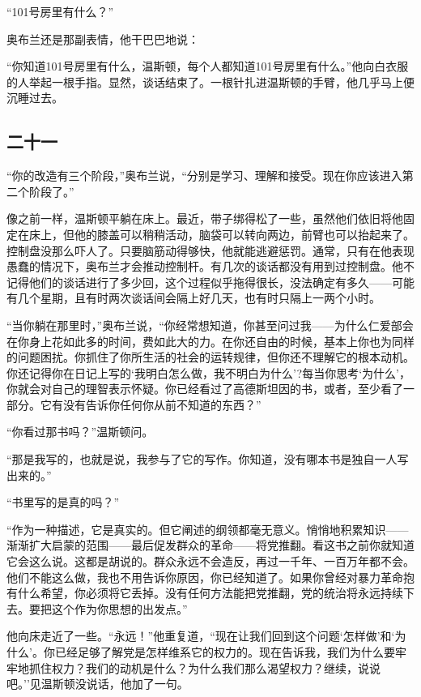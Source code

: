 ``101号房里有什么？''

奥布兰还是那副表情，他干巴巴地说：

``你知道101号房里有什么，温斯顿，每个人都知道101号房里有什么。''他向白衣服的人举起一根手指。显然，谈话结束了。一根针扎进温斯顿的手臂，他几乎马上便沉睡过去。

\subsection{二十一}\label{ux4e8cux5341ux4e00}

``你的改造有三个阶段，''奥布兰说，``分别是学习、理解和接受。现在你应该进入第二个阶段了。''

像之前一样，温斯顿平躺在床上。最近，带子绑得松了一些，虽然他们依旧将他固定在床上，但他的膝盖可以稍稍活动，脑袋可以转向两边，前臂也可以抬起来了。控制盘没那么吓人了。只要脑筋动得够快，他就能逃避惩罚。通常，只有在他表现愚蠢的情况下，奥布兰才会推动控制杆。有几次的谈话都没有用到过控制盘。他不记得他们的谈话进行了多少回，这个过程似乎拖得很长，没法确定有多久------可能有几个星期，且有时两次谈话间会隔上好几天，也有时只隔上一两个小时。

``当你躺在那里时，''奥布兰说，``你经常想知道，你甚至问过我------为什么仁爱部会在你身上花如此多的时间，费如此大的力。在你还自由的时候，基本上你也为同样的问题困扰。你抓住了你所生活的社会的运转规律，但你还不理解它的根本动机。你还记得你在日记上写的`我明白怎么做，我不明白为什么'?每当你思考`为什么'，你就会对自己的理智表示怀疑。你已经看过了高德斯坦因的书，或者，至少看了一部分。它有没有告诉你任何你从前不知道的东西？''

``你看过那书吗？''温斯顿问。

``那是我写的，也就是说，我参与了它的写作。你知道，没有哪本书是独自一人写出来的。''

``书里写的是真的吗？''

``作为一种描述，它是真实的。但它阐述的纲领都毫无意义。悄悄地积累知识------渐渐扩大启蒙的范围------最后促发群众的革命------将党推翻。看这书之前你就知道它会这么说。这都是胡说的。群众永远不会造反，再过一千年、一百万年都不会。他们不能这么做，我也不用告诉你原因，你已经知道了。如果你曾经对暴力革命抱有什么希望，你必须将它丢掉。没有任何方法能把党推翻，党的统治将永远持续下去。要把这个作为你思想的出发点。''

他向床走近了一些。``永远！''他重复道，``现在让我们回到这个问题`怎样做'和`为什么'。你已经足够了解党是怎样维系它的权力的。现在告诉我，我们为什么要牢牢地抓住权力？我们的动机是什么？为什么我们那么渴望权力？继续，说说吧。''见温斯顿没说话，他加了一句。

